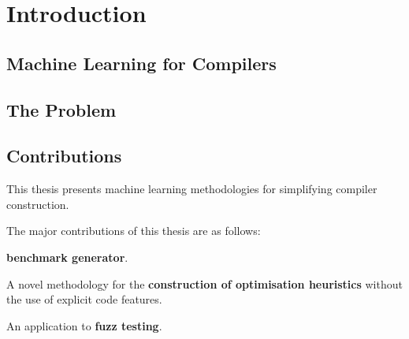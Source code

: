 \chapter{Introduction}

\lipsum[1-2]

\section{Machine Learning for Compilers}

\section{The Problem}

\section{Contributions}

This thesis presents machine learning methodologies for simplifying compiler construction.

The major contributions of this thesis are as follows:

\textbf{benchmark generator}.

A novel methodology for the \textbf{construction of optimisation heuristics} without the use of explicit code features.

An application to \textbf{fuzz testing}.

